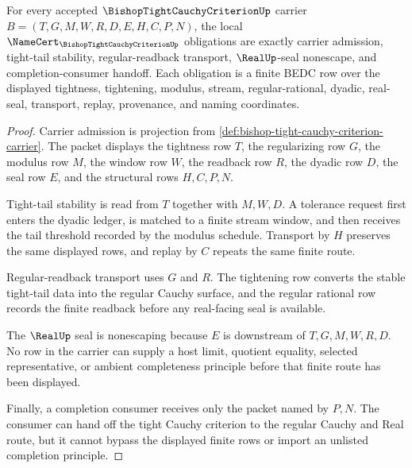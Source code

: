 \begin{theorem}
\label{thm:bishop-tight-cauchy-criterion-namecert-obligations}
For every accepted $\BishopTightCauchyCriterionUp$ carrier $B=(T,G,M,W,R,D,E,H,C,P,N)$, the local $\NameCert_{\BishopTightCauchyCriterionUp}$ obligations are exactly carrier admission, tight-tail stability, regular-readback transport, $\RealUp$-seal nonescape, and completion-consumer handoff. Each obligation is a finite BEDC row over the displayed tightness, tightening, modulus, stream, regular-rational, dyadic, real-seal, transport, replay, provenance, and naming coordinates.
\end{theorem}
\begin{proof}
Carrier admission is projection from \autoref{def:bishop-tight-cauchy-criterion-carrier}. The packet displays the tightness row $T$, the regularizing row $G$, the modulus row $M$, the window row $W$, the readback row $R$, the dyadic row $D$, the seal row $E$, and the structural rows $H,C,P,N$.

Tight-tail stability is read from $T$ together with $M,W,D$. A tolerance request first enters the dyadic ledger, is matched to a finite stream window, and then receives the tail threshold recorded by the modulus schedule. Transport by $H$ preserves the same displayed rows, and replay by $C$ repeats the same finite route.

Regular-readback transport uses $G$ and $R$. The tightening row converts the stable tight-tail data into the regular Cauchy surface, and the regular rational row records the finite readback before any real-facing seal is available.

The $\RealUp$ seal is nonescaping because $E$ is downstream of $T,G,M,W,R,D$. No row in the carrier can supply a host limit, quotient equality, selected representative, or ambient completeness principle before that finite route has been displayed.

Finally, a completion consumer receives only the packet named by $P,N$. The consumer can hand off the tight Cauchy criterion to the regular Cauchy and Real route, but it cannot bypass the displayed finite rows or import an unlisted completion principle.
\end{proof}


